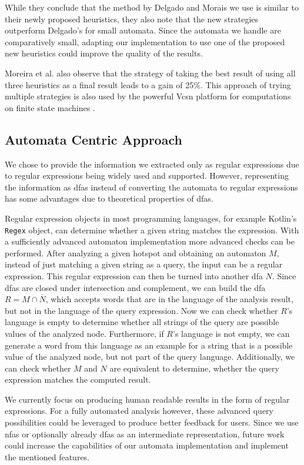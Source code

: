 While they conclude that the method by Delgado and Morais \cite{delgado} we use is similar to their newly proposed heuristics, they also note that the new strategies outperform Delgado's for small automata. Since the automata we handle are comparatively small, adapting our implementation to use one of the proposed new heuristics could improve the quality of the results.

Moreira et al. also observe that the strategy of taking the best result of using all three heuristics as a final result leads to a gain of 25\%. This approach of trying multiple strategies is also used by the powerful Vcsn platform for computations on finite state machines \cite{vcsn}.

\subsection{Automata Centric Approach}

We chose to provide the information we extracted only as regular expressions due to regular expressions being widely used and supported.
However, representing the information as \acp{dfa} instead of converting the automata to regular expressions has some advantages due to theoretical properties of \acp{dfa}.

Regular expression objects in most programming languages, for example Kotlin's \lstinline|Regex| object, can determine whether a given string matches the expression. With a sufficiently advanced automaton implementation more advanced checks can be performed.
After analyzing a given hotspot and obtaining an automaton $M$, instead of just matching a given string as a query, the input can be a regular expression. This regular expression can then be turned into another \ac{dfa} $N$.
Since \acp{dfa} are closed under intersection and complement, we can build the \ac{dfa} $R = M \cap \overline{N}$, which accepts words that are in the language of the analysis result, but not in the language of the query expression.
Now we can check whether $R$'s language is empty to determine whether all strings of the query are possible values of the analyzed node. Furthermore, if $R$'s language is not empty, we can generate a word from this language as an example for a string that is a possible value of the analyzed node, but not part of the query language.
Additionally, we can check whether $M$ and $N$ are equivalent to determine, whether the query expression matches the computed result.

We currently focus on producing human readable results in the form of regular expressions. For a fully automated analysis however, these advanced query possibilities could be leveraged to produce better feedback for users.
Since we use \acp{nfa} or optionally already \acp{dfa} as an intermediate representation, future work could increase the capabilities of our automata implementation and implement the mentioned features.

